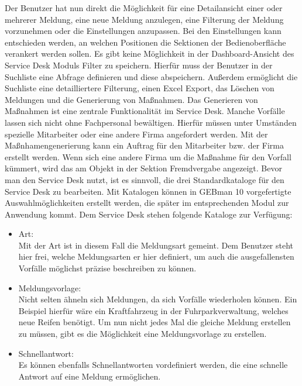 \noindent
Der Benutzer hat nun direkt die Möglichkeit für eine Detailansicht einer oder mehrerer Meldung, eine neue Meldung anzulegen, eine Filterung der Meldung vorzunehmen oder die Einstellungen anzupassen. Bei den Einstellungen kann entschieden werden, an welchen Positionen die Sektionen der Bedienoberfläche verankert werden sollen.\newline
Es gibt keine Möglichkeit in der Dashboard-Ansicht des Service Desk Moduls Filter zu speichern. Hierfür muss der Benutzer in der Suchliste eine Abfrage definieren und diese abspeichern. Außerdem ermöglicht die Suchliste eine detailliertere Filterung, einen Excel Export, das Löschen von Meldungen und die Generierung von Maßnahmen. Das Generieren von Maßnahmen ist eine zentrale Funktionalität im Service Desk. Manche Vorfälle lassen sich nicht ohne Fachpersonal bewältigen. Hierfür müssen unter Umständen spezielle Mitarbeiter oder eine andere Firma angefordert werden. Mit der Maßnhamengenerierung kann ein Auftrag für den Mitarbeiter bzw. der Firma erstellt werden. Wenn sich eine andere Firma um die Maßnahme für den Vorfall kümmert, wird das am Objekt in der Sektion Fremdvergabe angezeigt. \newline
Bevor man den Service Desk nutzt, ist es sinnvoll, die drei Standardkataloge für den Service Desk zu bearbeiten. Mit Katalogen können in GEBman 10  vorgefertigte Auswahlmöglichkeiten erstellt werden, die später im entsprechenden Modul zur Anwendung kommt. Dem Service Desk stehen folgende Kataloge zur Verfügung:

\begin{itemize}
\item Art:\\
		Mit der Art ist in diesem Fall die Meldungsart gemeint. Dem Benutzer steht hier frei, welche 
		Meldungsarten er hier definiert, um auch die ausgefallensten Vorfälle möglichst präzise beschreiben zu 
		können.   \\
		 
\item Meldungsvorlage:\\
		Nicht selten ähneln sich Meldungen, da sich Vorfälle wiederholen können. Ein Beispiel hierfür wäre ein 
		Kraftfahrzeug in der Fuhrparkverwaltung, welches neue Reifen benötigt. Um nun nicht jedes Mal die 
		gleiche Meldung erstellen zu müssen, gibt es die Möglichkeit eine Meldungsvorlage zu erstellen. \\
		
\item Schnellantwort:\\
		Es können ebenfalls Schnellantworten vordefiniert werden, die eine schnelle Antwort auf eine Meldung 
		ermöglichen.\\		
\end{itemize}

